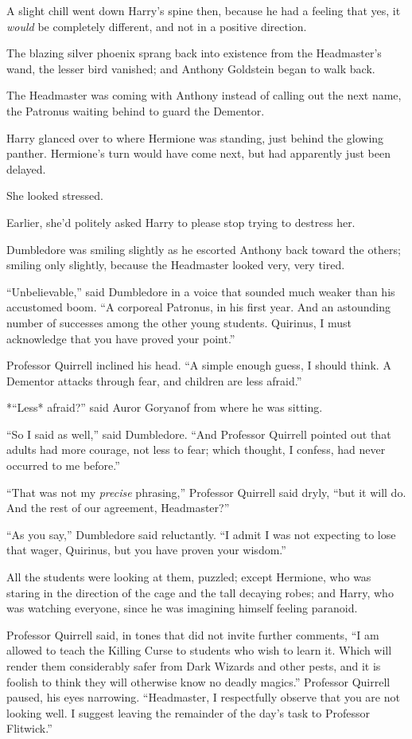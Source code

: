 A slight chill went down Harry's spine then, because he had a feeling
that yes, it \emph{would} be completely different, and not in a positive
direction.

The blazing silver phoenix sprang back into existence from the
Headmaster's wand, the lesser bird vanished; and Anthony Goldstein began
to walk back.

The Headmaster was coming with Anthony instead of calling out the next
name, the Patronus waiting behind to guard the Dementor.

Harry glanced over to where Hermione was standing, just behind the
glowing panther. Hermione's turn would have come next, but had
apparently just been delayed.

She looked stressed.

Earlier, she'd politely asked Harry to please stop trying to destress
her.

Dumbledore was smiling slightly as he escorted Anthony back toward the
others; smiling only slightly, because the Headmaster looked very, very
tired.

``Unbelievable,'' said Dumbledore in a voice that sounded much weaker
than his accustomed boom. ``A corporeal Patronus, in his first year. And
an astounding number of successes among the other young students.
Quirinus, I must acknowledge that you have proved your point.''

Professor Quirrell inclined his head. ``A simple enough guess, I should
think. A Dementor attacks through fear, and children are less afraid.''

*``Less* afraid?'' said Auror Goryanof from where he was sitting.

``So I said as well,'' said Dumbledore. ``And Professor Quirrell pointed
out that adults had more courage, not less to fear; which thought, I
confess, had never occurred to me before.''

``That was not my \emph{precise} phrasing,'' Professor Quirrell said
dryly, ``but it will do. And the rest of our agreement, Headmaster?''

``As you say,'' Dumbledore said reluctantly. ``I admit I was not
expecting to lose that wager, Quirinus, but you have proven your
wisdom.''

All the students were looking at them, puzzled; except Hermione, who was
staring in the direction of the cage and the tall decaying robes; and
Harry, who was watching everyone, since he was imagining himself feeling
paranoid.

Professor Quirrell said, in tones that did not invite further comments,
``I am allowed to teach the Killing Curse to students who wish to learn
it. Which will render them considerably safer from Dark Wizards and
other pests, and it is foolish to think they will otherwise know no
deadly magics.'' Professor Quirrell paused, his eyes narrowing.
``Headmaster, I respectfully observe that you are not looking well. I
suggest leaving the remainder of the day's task to Professor Flitwick.''

